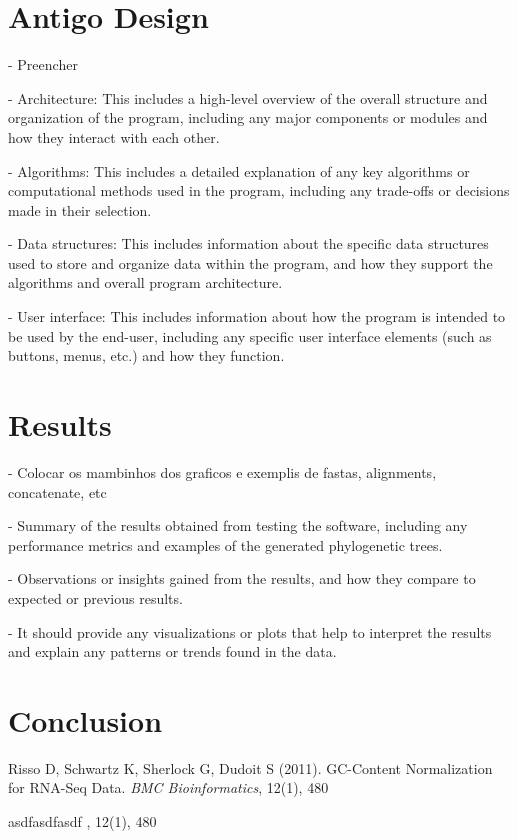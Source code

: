 \documentclass[12pt]{article}
\begin{document}
\section{Antigo Design}\label{sec:desenvolvimentos}
- Preencher

- Architecture: This includes a high-level overview of the overall structure and organization of the program, including any major components or modules and how they interact with each other.

- Algorithms: This includes a detailed explanation of any key algorithms or computational methods used in the program, including any trade-offs or decisions made in their selection.

- Data structures: This includes information about the specific data structures used to store and organize data within the program, and how they support the algorithms and overall program architecture.

- User interface: This includes information about how the program is intended to be used by the end-user, including any specific user interface elements (such as buttons, menus, etc.) and how they function.





\section{Results}\label{sec:desenvolvimentos}

- Colocar os mambinhos dos graficos e exemplis de fastas, alignments, concatenate, etc

- Summary of the results obtained from testing the software, including any performance metrics and examples of the generated phylogenetic trees. 

- Observations or insights gained from the results, and how they compare to expected or previous results. 

- It should provide any visualizations or plots that help to interpret the results and explain any patterns or trends found in the data.




\section{Conclusion}\label{sec:conclusoes}



\begin{thebibliography}{}

Risso D, Schwartz K, Sherlock G, Dudoit S (2011). GC-Content Normalization for RNA-Seq Data. \textit{BMC Bioinformatics}, 12(1), 480

asdfasdfasdf \textit{}, 12(1), 480

\end{thebibliography}
\end{document}
